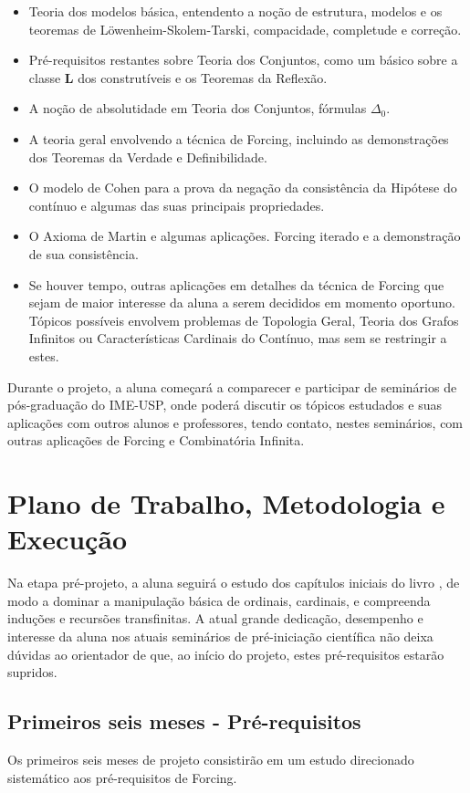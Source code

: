 \documentclass{article}
\begin{document}
    \begin{itemize}
        \item Teoria dos modelos básica, entendento a noção de estrutura, modelos e os teoremas de Löwenheim-Skolem-Tarski, compacidade, completude e correção.
        \item Pré-requisitos restantes sobre Teoria dos Conjuntos, como um básico sobre a classe $\mathbf{L}$ dos construtíveis e os Teoremas da Reflexão.
        \item A noção de absolutidade em Teoria dos Conjuntos, fórmulas $\Delta_0$.
        \item A teoria geral envolvendo a técnica de Forcing, incluindo as demonstrações dos Teoremas da Verdade e Definibilidade.
        \item O modelo de Cohen para a prova da negação da consistência da Hipótese do contínuo e algumas das suas principais propriedades.
        \item O Axioma de Martin e algumas aplicações. Forcing iterado e a demonstração de sua consistência.
        \item Se houver tempo, outras aplicações em detalhes da técnica de Forcing que sejam de maior interesse da aluna a serem decididos em momento oportuno. Tópicos possíveis envolvem problemas de Topologia Geral, Teoria dos Grafos Infinitos ou Características Cardinais do Contínuo, mas sem se restringir a estes.
    \end{itemize}

    Durante o projeto, a aluna começará a comparecer e participar de seminários de pós-graduação do IME-USP, onde poderá discutir os tópicos estudados e suas aplicações com outros alunos e professores, tendo contato, nestes seminários, com outras aplicações de Forcing e Combinatória Infinita.

\section{Plano de Trabalho, Metodologia e Execução}
    Na etapa pré-projeto, a aluna seguirá o estudo dos capítulos iniciais do livro \cite{hrbacek2017introduction}, de modo a dominar a manipulação básica de ordinais, cardinais, e compreenda induções e recursões transfinitas. A atual grande dedicação, desempenho e interesse da aluna nos atuais seminários de pré-iniciação científica não deixa dúvidas ao orientador de que, ao início do projeto, estes pré-requisitos estarão supridos.

    \subsection{Primeiros seis meses - Pré-requisitos}
    Os primeiros seis meses de projeto consistirão em um estudo direcionado sistemático aos pré-requisitos de Forcing.
\end{document}

